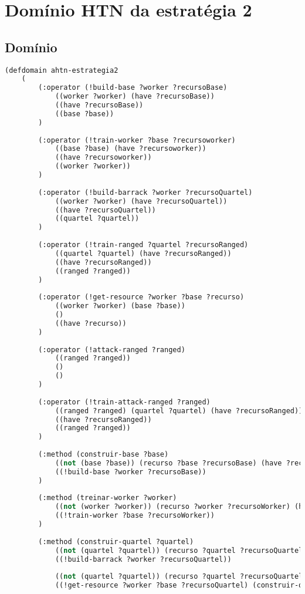 
\chapter{\label{apendiceB}Domínio HTN da estratégia 2}

\section{Domínio}


\lstset{style=codeStyle}
\begin{lstlisting}[language=lisp]
(defdomain ahtn-estrategia2
	(
		(:operator (!build-base ?worker ?recursoBase)
			((worker ?worker) (have ?recursoBase))
			((have ?recursoBase))
			((base ?base))
		)
		
		(:operator (!train-worker ?base ?recursoworker)
			((base ?base) (have ?recursoworker))
			((have ?recursoworker))
			((worker ?worker))
		)
		
		(:operator (!build-barrack ?worker ?recursoQuartel)
			((worker ?worker) (have ?recursoQuartel))
			((have ?recursoQuartel))
			((quartel ?quartel))
		)
		
		(:operator (!train-ranged ?quartel ?recursoRanged)
			((quartel ?quartel) (have ?recursoRanged))
			((have ?recursoRanged))
			((ranged ?ranged))
		)
		
		(:operator (!get-resource ?worker ?base ?recurso)
			((worker ?worker) (base ?base))
			()
			((have ?recurso))
		)
		
		(:operator (!attack-ranged ?ranged)
			((ranged ?ranged))
			()
			()
		)
		
		(:operator (!train-attack-ranged ?ranged)
			((ranged ?ranged) (quartel ?quartel) (have ?recursoRanged))
			((have ?recursoRanged))
			((ranged ?ranged))
		)
		
		(:method (construir-base ?base)
			((not (base ?base)) (recurso ?base ?recursoBase) (have ?recursoBase) (worker ?worker))
			((!build-base ?worker ?recursoBase))
		)
		
		(:method (treinar-worker ?worker)
			((not (worker ?worker)) (recurso ?worker ?recursoWorker) (have ?recursoWorker) (base ?base))
			((!train-worker ?base ?recursoWorker))
		)
		
		(:method (construir-quartel ?quartel)
			((not (quartel ?quartel)) (recurso ?quartel ?recursoQuartel) (have ?recursoQuartel) (worker ?worker)) 
			((!build-barrack ?worker ?recursoQuartel))
			
			((not (quartel ?quartel)) (recurso ?quartel ?recursoQuartel) (not (have ?recursoQuartel)) (worker ?worker) (base ?base))
			((!get-resource ?worker ?base ?recursoQuartel) (construir-quartel ?quartel))
			

\end{lstlisting}
